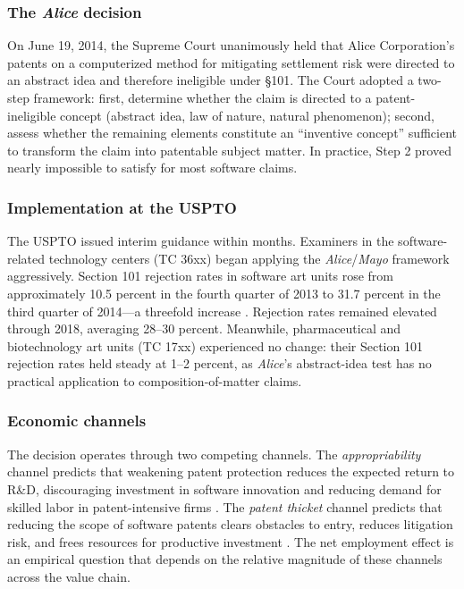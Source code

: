 \documentclass[12pt]{article}
\begin{document}
\subsubsection*{The \textit{Alice} decision} On June 19, 2014, the Supreme Court unanimously held that Alice Corporation's patents on a computerized method for mitigating settlement risk were directed to an abstract idea and therefore ineligible under \S 101. The Court adopted a two-step framework: first, determine whether the claim is directed to a patent-ineligible concept (abstract idea, law of nature, natural phenomenon); second, assess whether the remaining elements constitute an ``inventive concept'' sufficient to transform the claim into patentable subject matter. In practice, Step 2 proved nearly impossible to satisfy for most software claims.

\subsubsection*{Implementation at the USPTO} The USPTO issued interim guidance within months. Examiners in the software-related technology centers (TC 36xx) began applying the \textit{Alice}/\textit{Mayo} framework aggressively. Section 101 rejection rates in software art units rose from approximately 10.5 percent in the fourth quarter of 2013 to 31.7 percent in the third quarter of 2014---a threefold increase \citep{allison2015patent}. Rejection rates remained elevated through 2018, averaging 28--30 percent. Meanwhile, pharmaceutical and biotechnology art units (TC 17xx) experienced no change: their Section 101 rejection rates held steady at 1--2 percent, as \textit{Alice}'s abstract-idea test has no practical application to composition-of-matter claims.

\subsubsection*{Economic channels} The decision operates through two competing channels. The \emph{appropriability} channel predicts that weakening patent protection reduces the expected return to R\&D, discouraging investment in software innovation and reducing demand for skilled labor in patent-intensive firms \citep{nordhaus1969invention, mansfield1986patents}. The \emph{patent thicket} channel predicts that reducing the scope of software patents clears obstacles to entry, reduces litigation risk, and frees resources for productive investment \citep{bessen2008patent, heller1998can}. The net employment effect is an empirical question that depends on the relative magnitude of these channels across the value chain.
\end{document}
